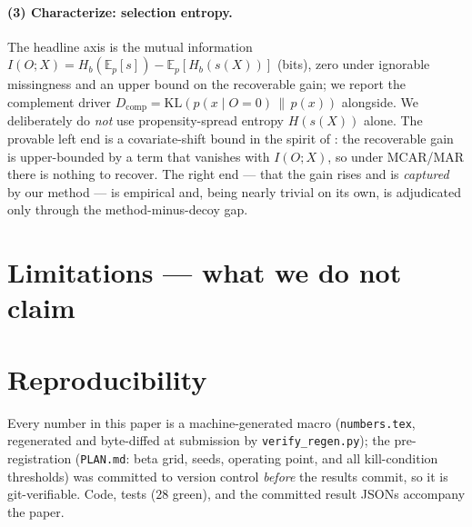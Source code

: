 \documentclass[10pt]{article}
\newcommand{\E}{\mathbb{E}}
\newcommand{\IOX}{I(O;X)}
\begin{document}
\paragraph{(3) Characterize: selection entropy.} The headline axis is the mutual
information $\IOX=H_b(\E_p[s])-\E_p[H_b(s(X))]$ (bits), zero under ignorable
missingness and an upper bound on the recoverable gain; we report the complement
driver $D_{\mathrm{comp}}=\mathrm{KL}(p(x\mid O{=}0)\,\|\,p(x))$ alongside. We
deliberately do \emph{not} use propensity-spread entropy $H(s(X))$ alone. The
provable left end is a covariate-shift bound in the spirit of
\citet{bendavid2010}: the recoverable gain is upper-bounded by a term that
vanishes with $\IOX$, so under MCAR/MAR there is nothing to recover. The right
end --- that the gain rises and is \emph{captured} by our method --- is empirical
and, being nearly trivial on its own, is adjudicated only through the
method-minus-decoy gap.



\section{Limitations --- what we do not claim}
\label{sec:limits}


\section{Reproducibility}
Every number in this paper is a machine-generated macro (\texttt{numbers.tex},
regenerated and byte-diffed at submission by \texttt{verify\_regen.py}); the
pre-registration (\texttt{PLAN.md}: beta grid, seeds, operating point, and all
kill-condition thresholds) was committed to version control \emph{before} the
results commit, so it is git-verifiable. Code, tests ($28$ green), and the
committed result JSONs accompany the paper.



\end{document}
